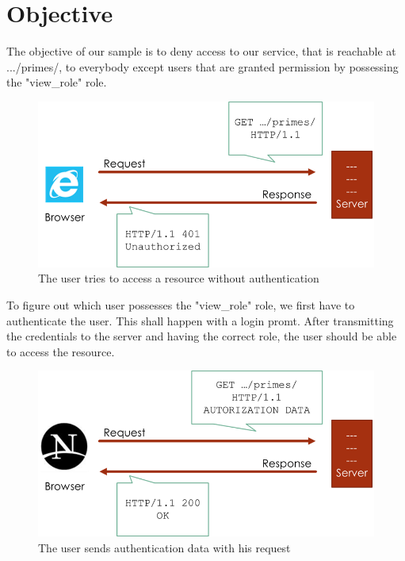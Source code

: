 \documentclass[12pt,a4paper]{report}
\begin{document}
\section{Objective}
The objective of our sample is to deny access to our service, that is reachable at .../primes/, to everybody except users that are granted permission by possessing the "view\_role" role.
\begin{figure}[h!]
\centering
\includegraphics[width=1\linewidth]{res/Unauthorized}
\caption{The user tries to access a resource without authentication}
\label{fig:Unauthorized}
\end{figure}

\noindent
To figure out which user possesses the "view\_role" role, we first have to authenticate the user. This shall happen with a login promt. After transmitting the credentials to the server and having the correct role, the user should be able to access the resource.
\begin{figure}[h!]
	\centering
	\includegraphics[width=1\linewidth]{res/Authorized}
	\caption{The user sends authentication data with his request}
	\label{fig:Authorized}
\end{figure}
\end{document}
